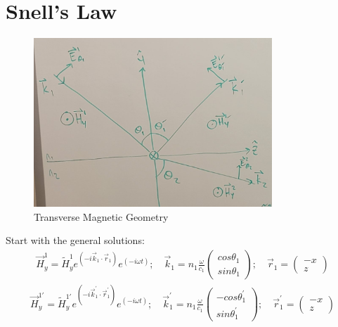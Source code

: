 \documentclass{article}
\begin{document}
\clearpage
\section{Snell's Law}

\noindent

\begin{figure}[ht!]
    \centering
    \includegraphics[width=0.8\textwidth]{TMG.jpg}
    \caption{Transverse Magnetic Geometry}
    \label{fig:my_label}
\end{figure}
Start with the general solutions:
\begin{align}
\vec{H}_{y}^{1} = \tilde{H}_{y}^{1} e^{\left( -i \vec{k}_{1} \cdot \vec{r}_{1} \right)} e^ {\left(-i \omega t \right)}; \quad 
\vec{k}_{1} = n_{1} \frac{\omega}{c_{1}} 
\begin{pmatrix}
	cos{\theta_{1}} \\
	sin{\theta_{1}}
\end{pmatrix}; \quad
\vec{r}_{1} = 
\begin{pmatrix}
	-x \\
	z
\end{pmatrix}
\end{align}
\begin{align}
\vec{H}_{y}^{1'} = \tilde{H}_{y}^{1'} e^{\left( -i \vec{k}_{1}^{'} \cdot \vec{r}_{1}^{'} \right)} e^ {\left(-i \omega t \right)}; \quad 
\vec{k}_{1}^{'} = n_{1} \frac{\omega}{c_{1}} 
\begin{pmatrix}
	-cos{\theta_{1}^{'}}\\
	sin{\theta_{1}^{'}}
\end{pmatrix}; \quad
\vec{r}_{1}^{'} = 
\begin{pmatrix}
	-x \\
	z
\end{pmatrix}
\end{align}
\end{document}

